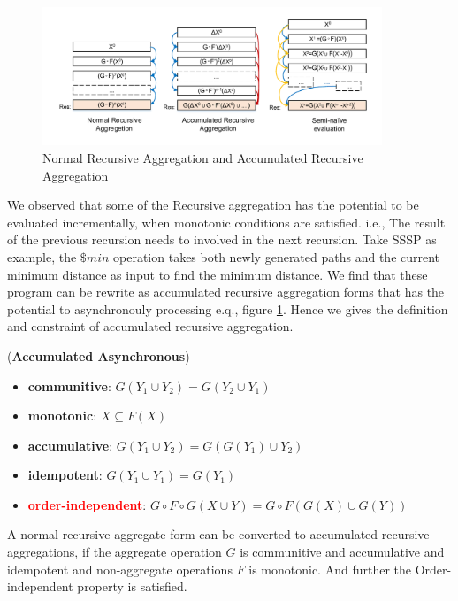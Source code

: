 {
	\begin{figure}[t]
		\vspace{-0.1in}
		\centerline{\includegraphics[width=4in]{fig/accumulative.pdf}}
		\caption{Normal Recursive Aggregation and Accumulated Recursive Aggregation }
		\vspace{-0.1in}
		\label{fig:arasssp}
	\end{figure}

We observed that some of the Recursive aggregation has the potential to be evaluated incrementally, when monotonic conditions are satisfied. i.e., The result of the previous recursion needs to involved in the next recursion. Take SSSP as example, the $\$min$ operation takes both newly generated paths and the current minimum distance as input to find the minimum distance. We find that these program can be rewrite as accumulated recursive aggregation forms that has the potential to asynchronouly processing e.q., figure \ref{fig:arasssp}. Hence we gives the definition and constraint of accumulated recursive aggregation.


\begin{definition}
	\label{th:monotone}
	(\textbf{Accumulated Asynchronous}) 
	\begin{itemize}
		\item \textbf{communitive}: $G(Y_1\cup Y_2)=G(Y_2\cup Y_1)$
		\item \textbf{monotonic}: $X\subseteq F(X)$
		\item \textbf{accumulative}: $G(Y_1\cup Y_2)=G(G(Y_1)\cup Y_2)$
		\item \textbf{idempotent}: $G(Y_1\cup Y_1)=G(Y_1)$
		\item \textcolor{red}{\textbf{order-independent}}: $G\circ F\circ G(X\cup Y)=G\circ F( G(X)\cup G(Y))$
	\end{itemize}
	A normal recursive aggregate form can be converted to accumulated recursive aggregations, if the aggregate operation $G$ is communitive and accumulative and idempotent and non-aggregate operations $F$ is monotonic. And further the Order-independent property is satisfied.
\end{definition}
	
}
